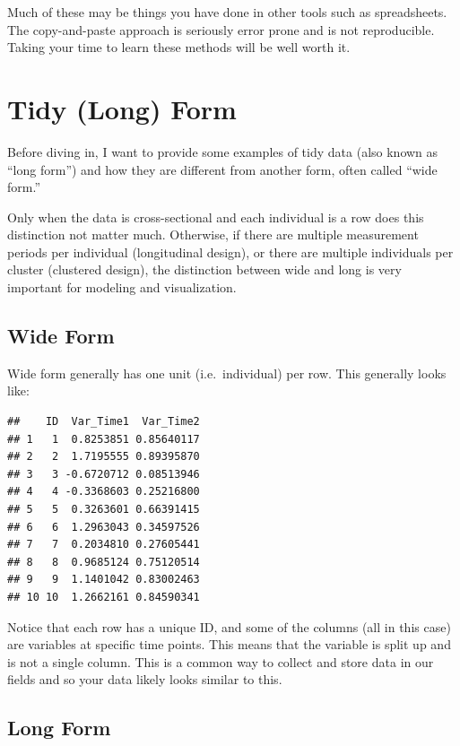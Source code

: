 \documentclass[]{tufte-book}
\theoremstyle{definition}
\theoremstyle{definition}
\theoremstyle{remark}
\begin{document}
Much of these may be things you have done in other tools such as
spreadsheets. The copy-and-paste approach is seriously error prone and
is not reproducible. Taking your time to learn these methods will be
well worth it.

\section*{Tidy (Long) Form}\label{tidy-long-form}

Before diving in, I want to provide some examples of tidy data (also
known as ``long form'') and how they are different from another form,
often called ``wide form.''

Only when the data is cross-sectional and each individual is a row does
this distinction not matter much. Otherwise, if there are multiple
measurement periods per individual (longitudinal design), or there are
multiple individuals per cluster (clustered design), the distinction
between wide and long is very important for modeling and visualization.

\subsection*{Wide Form}\label{wide-form}

Wide form generally has one unit (i.e.~individual) per row. This
generally looks like:

\begin{verbatim}
##    ID  Var_Time1  Var_Time2
## 1   1  0.8253851 0.85640117
## 2   2  1.7195555 0.89395870
## 3   3 -0.6720712 0.08513946
## 4   4 -0.3368603 0.25216800
## 5   5  0.3263601 0.66391415
## 6   6  1.2963043 0.34597526
## 7   7  0.2034810 0.27605441
## 8   8  0.9685124 0.75120514
## 9   9  1.1401042 0.83002463
## 10 10  1.2662161 0.84590341
\end{verbatim}

Notice that each row has a unique ID, and some of the columns (all in
this case) are variables at specific time points. This means that the
variable is split up and is not a single column. This is a common way to
collect and store data in our fields and so your data likely looks
similar to this.

\subsection*{Long Form}\label{long-form}
\end{document}
